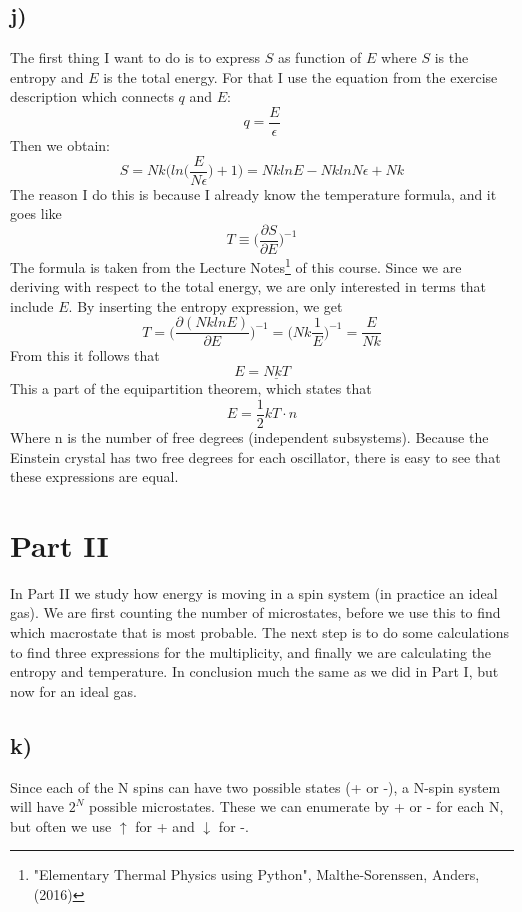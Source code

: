 \documentclass{scrartcl}
\begin{document}
\subsection*{j)}
The first thing I want to do is to express $S$ as function of $E$ where $S$ is the entropy and $E$ is the total energy. For that I use the equation from the exercise description which connects $q$ and $E$: 
\begin{equation}
q=\frac{E}{\epsilon}
\end{equation}
Then we obtain:
$$S=Nk\Bigg(ln\bigg(\frac{E}{N\epsilon}\bigg)+1\Bigg)=Nk ln E-Nk ln N\epsilon + Nk$$
The reason I do this is because I already know the temperature formula, and it goes like
\begin{equation}
T\equiv \bigg(\frac{\partial S}{\partial E}\bigg)^{-1}
\end{equation}
The formula is taken from the Lecture Notes\footnote{  "Elementary Thermal Physics using Python", Malthe-Sorenssen, Anders, (2016)} of this course. Since we are deriving with respect to the total energy, we are only interested in terms that include $E$. By inserting the entropy expression, we get
$$T=\bigg(\frac{\partial(NklnE)}{\partial E}\bigg)^{-1}=\bigg(Nk\frac{1}{E}\bigg)^{-1}=\frac{E}{Nk}$$
From this it follows that
$$E=\underline{NkT}$$
This a part of the equipartition theorem, which states that
$$E=\frac{1}{2}kT\cdot n$$
Where n is the number of free degrees (independent subsystems). Because the Einstein crystal has two free degrees for each oscillator, there is easy to see that these expressions are equal.
\newpage

\section{Part II}
In Part II we study how energy is moving in a spin system (in practice an ideal gas). We are first counting the number of microstates, before we use this to find which macrostate that is most probable. The next step is to do some calculations to find three expressions for the multiplicity, and finally we are calculating the entropy and temperature. In conclusion much the same as we did in Part I, but now for an ideal gas.
\subsection*{k)}
Since each of the N spins can have two possible states (+ or -), a N-spin system will have $2^N$ possible microstates. These we can enumerate by + or - for each N, but often we use $\uparrow$ for + and $\downarrow$ for -.
\end{document}
